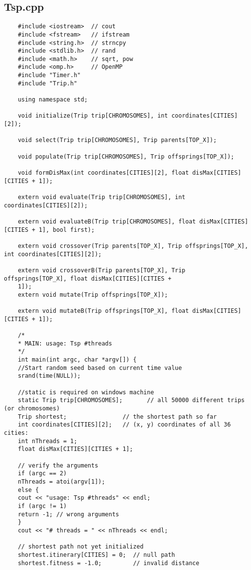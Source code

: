 \documentclass[11pt, letterpaper]{article}
\begin{document}
	\subsection{Tsp.cpp}
	\begin{lstlisting}
	#include <iostream>  // cout
	#include <fstream>   // ifstream
	#include <string.h>  // strncpy
	#include <stdlib.h>  // rand
	#include <math.h>    // sqrt, pow
	#include <omp.h>     // OpenMP
	#include "Timer.h"
	#include "Trip.h"
	
	using namespace std;
	
	void initialize(Trip trip[CHROMOSOMES], int coordinates[CITIES][2]);
	
	void select(Trip trip[CHROMOSOMES], Trip parents[TOP_X]);
	
	void populate(Trip trip[CHROMOSOMES], Trip offsprings[TOP_X]);
	
	void formDisMax(int coordinates[CITIES][2], float disMax[CITIES][CITIES + 1]);
	
	extern void evaluate(Trip trip[CHROMOSOMES], int coordinates[CITIES][2]);
	
	extern void evaluateB(Trip trip[CHROMOSOMES], float disMax[CITIES][CITIES + 1], bool first);
	
	extern void crossover(Trip parents[TOP_X], Trip offsprings[TOP_X], int coordinates[CITIES][2]);
	
	extern void crossoverB(Trip parents[TOP_X], Trip offsprings[TOP_X], float disMax[CITIES][CITIES +
	1]);
	extern void mutate(Trip offsprings[TOP_X]);
	
	extern void mutateB(Trip offsprings[TOP_X], float disMax[CITIES][CITIES + 1]);
	
	/*
	* MAIN: usage: Tsp #threads
	*/
	int main(int argc, char *argv[]) {
	//Start random seed based on current time value
	srand(time(NULL));
	
	//static is required on windows machine
	static Trip trip[CHROMOSOMES];       // all 50000 different trips (or chromosomes)
	Trip shortest;                // the shortest path so far
	int coordinates[CITIES][2];   // (x, y) coordinates of all 36 cities:
	int nThreads = 1;
	float disMax[CITIES][CITIES + 1];
	
	// verify the arguments
	if (argc == 2)
	nThreads = atoi(argv[1]);
	else {
	cout << "usage: Tsp #threads" << endl;
	if (argc != 1)
	return -1; // wrong arguments
	}
	cout << "# threads = " << nThreads << endl;
	
	// shortest path not yet initialized
	shortest.itinerary[CITIES] = 0;  // null path
	shortest.fitness = -1.0;         // invalid distance
	

\end{lstlisting}
\end{document}
